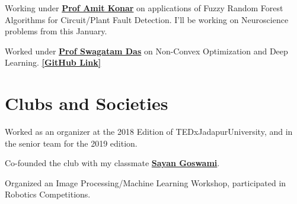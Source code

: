 \documentclass[]{deedy-resume-openfont}
\begin{document}
\begin{minipage}[t]{0.66\textwidth}
Working under \textbf{\href{https://www.amitkonar.com/}{Prof Amit Konar}} on applications of Fuzzy Random Forest Algorithms for Circuit/Plant Fault Detection. I'll be working on Neuroscience problems from this January. 
\sectionsep

Worked under \textbf{\href{https://www.isical.ac.in/~swagatam.das/}{Prof Swagatam Das}} on Non-Convex Optimization and Deep Learning.
\textbf{\href{https://github.com/AyanSinhaMahapatra/Gene_Algos}{ [GitHub Link] }}


\section{Clubs and Societies}
 
Worked as an organizer at the 2018 Edition of TEDxJadapurUniversity, and in the senior team for the 2019 edition.  
\sectionsep

Co-founded the club with my classmate \textbf{\href{https://github.com/Sayan98}{Sayan Goswami}}. \\
\sectionsep 

Organized an Image Processing/Machine Learning Workshop, participated in Robotics Competitions. 
\sectionsep


\end{minipage} 
\end{document}
